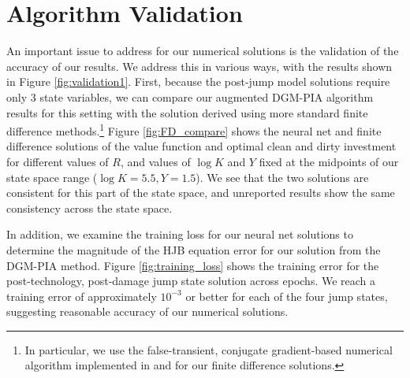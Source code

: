 \documentclass[12pt]{article}
\begin{document}







\section{Algorithm Validation}\label{sec:validation}

 An important issue to address for our numerical solutions is the validation of the accuracy of our results. We address this in various ways, with the results shown in Figure \ref{fig:validation1}. First, because the post-jump model solutions require only 3 state variables, we can compare our augmented DGM-PIA algorithm results for this setting with the solution derived using more standard finite difference methods.\footnote{In particular, we use the false-transient, conjugate gradient-based numerical algorithm implemented in \cite{BarnettBrockHansen:2020} and \cite{BarnettBrockHansen:2021} for our finite difference solutions.} Figure \ref{fig:FD_compare} shows the neural net and finite difference solutions of the value function and optimal clean and dirty investment for different values of $R$, and values of $\log K$ and $Y$ fixed at the midpoints of our state space range ($\log K = 5.5, Y = 1.5$). We see that the two solutions are consistent for this part of the state space, and unreported results show the same consistency across the state space.
 
 In addition, we examine the training loss for our neural net solutions to determine the magnitude of the HJB equation error for our solution from the DGM-PIA method. Figure \ref{fig:training_loss} shows the training error for the post-technology, post-damage jump state solution across epochs. We reach a training error of approximately $10^{-3}$ or better for each of the four jump states, suggesting reasonable accuracy of our numerical solutions.
\end{document}
